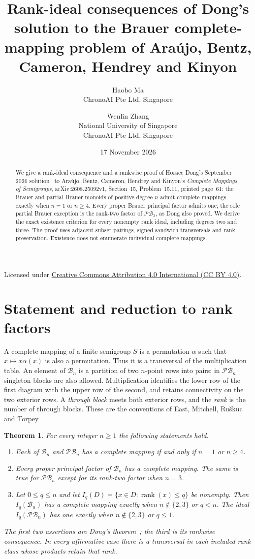 \documentclass[11pt,a4paper]{article}
\title{Rank-ideal consequences of Dong's solution to the Brauer complete-mapping problem of Ara\'ujo, Bentz, Cameron, Hendrey and Kinyon}
\author{Haobo Ma\\\small ChronoAI Pte Ltd, Singapore
\and Wenlin Zhang\\\small National University of Singapore\\\small ChronoAI Pte Ltd, Singapore}
\date{17 November 2026}
\newtheorem{theorem}{Theorem}
\newcommand{\B}{\mathcal B}
\newcommand{\PB}{\mathcal{PB}}
\begin{document}
\maketitle
\begin{abstract}
We give a rank-ideal consequence and a rankwise proof of Horace Dong's September 2026 solution~\cite[Theorem~1.1; version~2, October 2026]{Dong} to Ara\'ujo, Bentz, Cameron, Hendrey and Kinyon's \emph{Complete Mappings of Semigroups}, arXiv:2608.25092v1, Section~15, Problem~15.11, printed page~61: the Brauer and partial Brauer monoids of positive degree $n$ admit complete mappings exactly when $n=1$ or $n\ge4$.
Every proper Brauer principal factor admits one; the sole partial Brauer exception is the rank-two factor of $\PB_3$, as Dong also proved. We derive the exact existence criterion for every nonempty rank ideal, including degrees two and three. The proof uses adjacent-subset pairings, signed sandwich transversals and rank preservation. Existence does not enumerate individual complete mappings.
\end{abstract}
\begingroup\small
\noindent Licensed under \href{https://creativecommons.org/licenses/by/4.0/}{Creative Commons Attribution 4.0 International (CC BY 4.0)}.
\endgroup

\section{Statement and reduction to rank factors}
A complete mapping of a finite semigroup $S$ is a permutation $\alpha$ such that $x\mapsto x\alpha(x)$ is also a permutation. Thus it is a transversal of the multiplication table. An element of $\B_n$ is a partition of two $n$-point rows into pairs; in $\PB_n$ singleton blocks are also allowed. Multiplication identifies the lower row of the first diagram with the upper row of the second, and retains connectivity on the two exterior rows. A \emph{through block} meets both exterior rows, and the \emph{rank} is the number of through blocks. These are the conventions of East, Mitchell, Ru\v skuc and Torpey~\cite[Sections~2.1--2.2]{EMRT}.

\begin{theorem}\label{thm:main}
For every integer $n\ge1$ the following statements hold.
\begin{enumerate}
\item Each of $\B_n$ and $\PB_n$ has a complete mapping if and only if $n=1$ or $n\ge4$.
\item Every proper principal factor of $\B_n$ has a complete mapping. The same is true for $\PB_n$ except for its rank-two factor when $n=3$.
\item Let $0\le q\le n$ and let $I_q(D)=\{x\in D:\operatorname{rank}(x)\le q\}$ be nonempty. Then $I_q(\B_n)$ has a complete mapping exactly when $n\notin\{2,3\}$ or $q<n$. The ideal $I_q(\PB_n)$ has one exactly when $n\notin\{2,3\}$ or $q\le1$.
\end{enumerate}
The first two assertions are Dong's theorem~\cite[Theorem~1.1]{Dong}; the third is its rankwise consequence. In every affirmative case there is a transversal in each included rank class whose products retain that rank.
\end{theorem}
\end{document}
